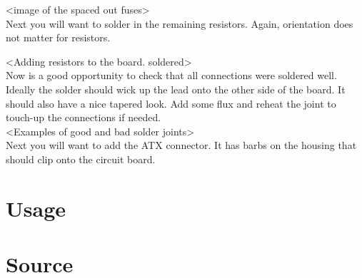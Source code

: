 \documentclass{article}
\begin{document}
<image of the spaced out fuses> \\   

Next you will want to solder in the remaining resistors. Again, orientation does not matter for resistors.

<Adding resistors to the board. soldered> \\

Now is a good opportunity to check that all connections were soldered well. Ideally the solder should wick up the lead onto the other side of the board. It should also have a nice tapered look. Add some flux and reheat the joint to touch-up the connections if needed. \\

<Examples of good and bad solder joints> \\

Next you will want to add the ATX connector. It has barbs on the housing that should clip onto the circuit board. 

\section{Usage}

\section{Source}
\end{document}
